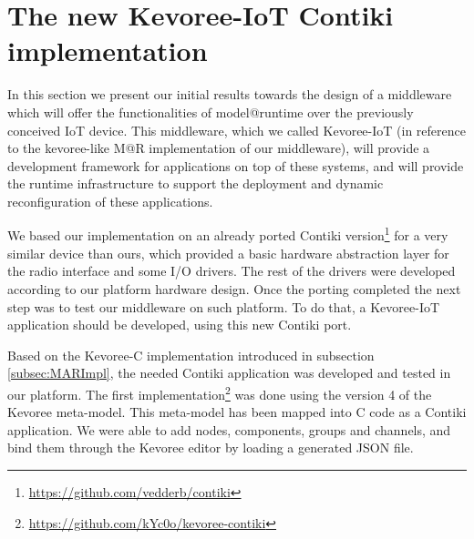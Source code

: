 \section{The new Kevoree-IoT Contiki implementation}
\label{subsec:kevoreeContikiImpl}
In this section we present our initial results towards the design of a middleware which will offer the functionalities of model@runtime over the previously conceived IoT device. 
This middleware, which we called Kevoree-IoT (in reference to the kevoree-like M@R implementation of our middleware), will provide a development framework for applications on top of these systems, and will provide the runtime infrastructure to support the deployment and dynamic reconfiguration of these applications.

We based our implementation on an already ported Contiki version\footnote{\url{https://github.com/vedderb/contiki}} for a very similar device than ours, which provided a basic hardware abstraction layer for the radio interface and some I/O drivers.
The rest of the drivers were developed according to our platform hardware design.
Once the porting completed the next step was to test our middleware on such platform.
To do that, a Kevoree-IoT application should be developed, using this new Contiki port.




Based on the Kevoree-C implementation introduced in subsection \ref{subsec:MARImpl}, the needed Contiki application was developed and tested in our platform.
The first implementation\footnote{\url{https://github.com/kYc0o/kevoree-contiki}} was done using the version 4 of the Kevoree meta-model.
This meta-model has been mapped into C code as a Contiki application.
We were able to add nodes, components, groups and channels, and bind them through the Kevoree editor by loading a generated JSON file.

